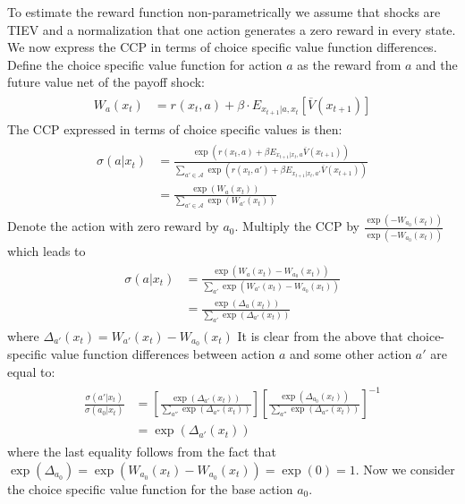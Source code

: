 \documentclass{article}
\begin{document}
\begin{appendix}
To estimate the reward function non-parametrically we assume that shocks are TIEV and a normalization that one action generates a zero reward in every state. 
We now express the CCP in terms of choice specific value function differences. Define the choice specific value function for action $a$ as the reward from $a$ and the future value net of the payoff shock:
\begin{align}
\begin{split}
W_a(x_t) &= r_{}(x_t,a)+\beta  \cdot E_{x_{t+1}|a,x_t} \left[ \overline{V}(x_{t+1}) \right] 
\end{split}
\end{align}
The CCP expressed in terms of choice specific values is then:
\begin{align} 
\begin{split}
\sigma(a|x_t)&=\frac{\exp\left(r(x_t,a)+\beta E_{x_{t+1}|x_t,a} \overline{V}(x_{t+1})\right)}{\sum_{a'\in\mathcal{A}} \exp\left(r(x_t,a')+\beta E_{x_{t+1}|x_t,a'} \overline{V}(x_{t+1})\right)}\\
&=\frac{\exp(W_a(x_t))}{\sum_{a'\in\mathcal{A}} \exp(W_{a'}(x_t))}
\end{split}
\end{align}
Denote the action with zero reward by $a_0$. Multiply the CCP by $\frac{\exp(-W_{a_0}(x_t))}{\exp(-W_{a_0}(x_t))}$ which leads to  
\begin{align}
\begin{split}
\sigma(a|x_t)&=\frac{\exp(W_a(x_t)-W_{a_0}(x_t))}{\sum_{a'} \exp(W_{a'}(x_t)-W_{a_0}(x_t))}\\
&=\frac{\exp(\Delta_a(x_t))}{\sum_{a'} \exp(\Delta_{a'}(x_t))}
\end{split}
\end{align}
where $\Delta_{a'}(x_t)=W_{a'}(x_t)-W_{a_0}(x_t)$
It is clear from the above that choice-specific value function differences between action $a$ and some other action $a'$ are equal to:
\begin{align}\label{eq:ccp_ratio}
\begin{split}
\frac{\sigma(a'|x_t)}{\sigma(a_0|x_t)}&=
\left[
\frac
  {\exp(\Delta_{a'}(x_t))}
  {\sum_{a''} \exp(\Delta_{a''}(x_t))}
\right]
\left[\frac{\exp(\Delta_{a_0}(x_t))}{\sum_{a''} \exp(\Delta_{a''}(x_t))}\right]^{-1}\\
&=\exp(\Delta_{a'}(x_t))
\end{split}
\end{align}
where the last equality follows from the fact that $\exp(\Delta_{a_0})=\exp(W_{a_0}(x_t)-W_{a_0}(x_t))=\exp(0)=1$.
Now we consider the choice specific value function for the base action $a_0$. 

\end{appendix}
\end{document}

